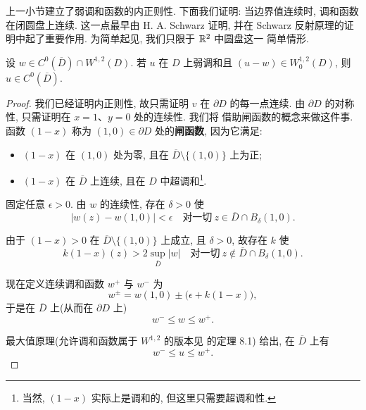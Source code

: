 上一小节建立了弱调和函数的内正则性. 下面我们证明: 当边界值连续时,
调和函数在闭圆盘上连续. 这一点最早由 H. A. Schwarz 证明, 并在 Schwarz
反射原理的证明中起了重要作用. 为简单起见, 我们只限于 $\mathbb{R}^2$ 中圆盘这一
简单情形.

\begin{lemma}
\label{lem:4.10}
设 $w\in C^0(\overline{D})\cap W^{1,2}(D)$. 若 $u$ 在 $D$ 上弱调和且
$(u-w)\in W_0^{1,2}(D)$, 则 $u\in C^0(\overline{D})$.
\end{lemma}

\begin{proof}
我们已经证明内正则性, 故只需证明 $v$ 在 $\partial D$ 的每一点连续.
由 $\partial D$ 的对称性, 只需证明在 $x=1$、$y=0$ 处的连续性. 我们将
借助闸函数的概念来做这件事. 函数 $(1-x)$ 称为
$(1,0)\in\partial D$ 处的\textbf{闸函数}, 因为它满足:

\begin{itemize}[leftmargin=1.6em,itemsep=2pt,topsep=2pt]
\item $(1-x)$ 在 $(1,0)$ 处为零, 且在
      $\overline{D}\setminus\{(1,0)\}$ 上为正;
\item $(1-x)$ 在 $\overline{D}$ 上连续, 且在 $D$ 中超调和\footnote{当然,
      $(1-x)$ 实际上是调和的, 但这里只需要超调和性.}.
\end{itemize}

固定任意 $\epsilon>0$. 由 $w$ 的连续性, 存在 $\delta>0$ 使
\begin{equation*}
|w(z)-w(1,0)|<\epsilon
 \quad\text{对一切}\ z\in\overline{D}\cap B_\delta(1,0).
\end{equation*}

由于 $(1-x)>0$ 在 $\overline{D}\setminus\{(1,0)\}$ 上成立, 且 $\delta>0$,
故存在 $k$ 使
\begin{equation*}
k(1-x)(z)>2\sup_{\overline{D}}|w|
 \quad\text{对一切}\ z\notin\overline{D}\cap B_\delta(1,0).
\end{equation*}

现在定义连续调和函数 $w^+$ 与 $w^-$ 为
\begin{equation*}
w^\pm=w(1,0)\pm\bigl(\epsilon+k(1-x)\bigr),
\end{equation*}
于是在 $\overline{D}$ 上(从而在 $\partial D$ 上)
\begin{equation*}
w^-\leq w\leq w^+.
\end{equation*}

最大值原理(允许调和函数属于 $W^{1,2}$ 的版本见 \cite{GiTr} 的定理 8.1)
给出, 在 $\overline{D}$ 上有
\begin{equation}
w^-\leq u\leq w^+.
\label{eq:4.18}
\end{equation}


\end{proof}
